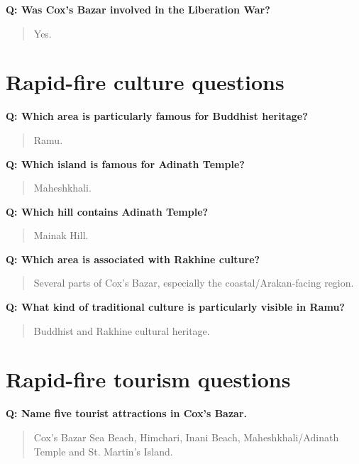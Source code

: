 \textbf{Q: Was Cox's Bazar involved in the Liberation War?}

\begin{quote}
Yes.\\
\end{quote}

\medskip

\section{Rapid-fire culture questions}

\textbf{Q: Which area is particularly famous for Buddhist heritage?}

\begin{quote}
Ramu.\\
\end{quote}

\textbf{Q: Which island is famous for Adinath Temple?}

\begin{quote}
Maheshkhali.\\
\end{quote}

\textbf{Q: Which hill contains Adinath Temple?}

\begin{quote}
Mainak Hill.\\
\end{quote}

\textbf{Q: Which area is associated with Rakhine culture?}

\begin{quote}
Several parts of Cox's Bazar, especially the coastal/Arakan-facing region.\\
\end{quote}

\textbf{Q: What kind of traditional culture is particularly visible in Ramu?}

\begin{quote}
Buddhist and Rakhine cultural heritage.\\
\end{quote}

\medskip

\section{Rapid-fire tourism questions}

\textbf{Q: Name five tourist attractions in Cox's Bazar.}

\begin{quote}
Cox's Bazar Sea Beach, Himchari, Inani Beach, Maheshkhali/Adinath Temple and St. Martin's Island.\\
\end{quote}

